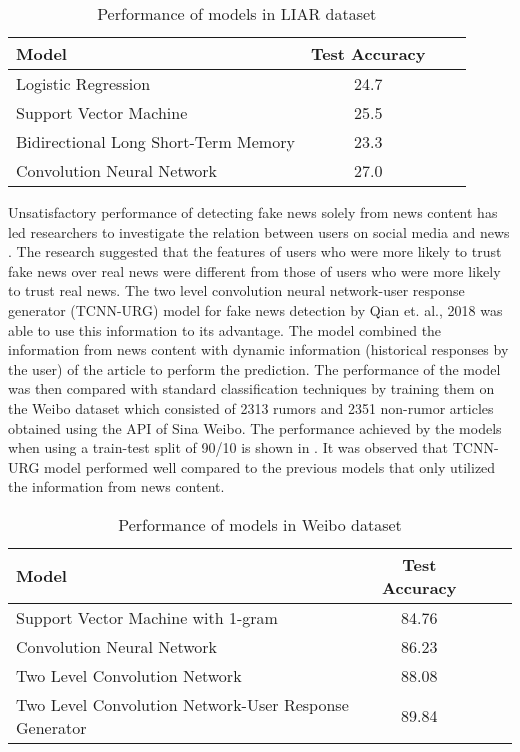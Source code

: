 \begin{table}[h]
\begin{center}
\caption{Performance of models in LIAR dataset}
\label{tbl:liar_performance}
\begin{tabular}{lccc}
\toprule 
Model&Test Accuracy\\
\midrule 
Logistic Regression&24.7\\
Support Vector Machine&25.5\\
Bidirectional Long Short-Term Memory&23.3\\
Convolution Neural Network&27.0\\
\bottomrule
\end{tabular}
\end{center}
\end{table}

Unsatisfactory performance of detecting fake news solely from news content has led researchers to investigate the relation between users on social media and news \cite{shu2018understanding}. The research suggested that the features of users who were more likely to trust fake news over real news were different from those of users who were more likely to trust real news. The two level convolution neural network-user response generator (TCNN-URG) model for fake news detection by Qian et. al., 2018 was able to use this information to its advantage. The model combined the information from news content with dynamic information (historical responses by the user) of the article to perform the prediction. The performance of the model was then compared with standard classification techniques by training them on the Weibo dataset\cite{ma2016detecting} which consisted of 2313 rumors and 2351 non-rumor articles obtained using the API of Sina Weibo. The performance achieved by the models when using a train-test split of 90/10 is shown in  \cite{qian2018neural}. It was observed that TCNN-URG model performed well compared to the previous models that only utilized the information from news content.

\begin{table}[h]
\begin{center}
\caption{Performance of models in Weibo dataset}
\label{tbl:weibo_performance}
\begin{tabular}{lccc}
\toprule 
\rule[-1pt]{0pt}{14pt}Model&Test Accuracy\\
\midrule 
Support Vector Machine with 1-gram&84.76\\
Convolution Neural Network&86.23\\
Two Level Convolution Network&88.08\\
Two Level Convolution Network-User Response Generator&89.84\\
\bottomrule
\end{tabular}
\end{center}
\end{table}

